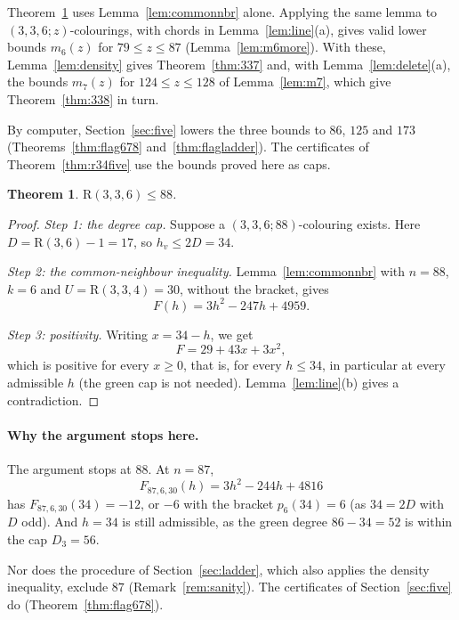 \documentclass[11pt]{article}
\theoremstyle{spacedplain}
\newtheorem{theorem}{Theorem}[section]
\theoremstyle{spaceddef}
\theoremstyle{spacedremark}
\newcommand{\R}{\mathrm{R}}
\begin{document}
Theorem~\ref{thm:336} uses Lemma~\ref{lem:commonnbr} alone.
Applying the same lemma to $(3,3,6;z)$-colourings, with chords in Lemma~\ref{lem:line}(a), gives valid lower bounds $m_6(z)$ for $79\le z\le 87$ (Lemma~\ref{lem:m6more}).
With these, Lemma~\ref{lem:density} gives Theorem~\ref{thm:337} and, with Lemma~\ref{lem:delete}(a), the bounds $m_7(z)$ for $124\le z\le 128$ of Lemma~\ref{lem:m7}, which give Theorem~\ref{thm:338} in turn.

By computer, Section~\ref{sec:five} lowers the three bounds to $86$, $125$ and $173$ (Theorems~\ref{thm:flag678} and~\ref{thm:flagladder}).
The certificates of Theorem~\ref{thm:r34five} use the bounds proved here as caps.

\begin{theorem}\label{thm:336}
$\R(3,3,6)\le 88$.
\end{theorem}

\begin{proof}
\emph{Step 1: the degree cap.}
Suppose a $(3,3,6;88)$-colouring exists.
Here $D=\R(3,6)-1=17$, so $h_v\le 2D=34$.

\emph{Step 2: the common-neighbour inequality.}
Lemma~\ref{lem:commonnbr} with $n=88$, $k=6$ and $U=\R(3,3,4)=30$, without the bracket, gives
\[
F(h)=3h^2-247h+4959.
\]

\emph{Step 3: positivity.}
Writing $x=34-h$, we get
\[
F=29+43x+3x^2,
\]
which is positive for every $x\ge 0$, that is, for every $h\le 34$, in particular at every admissible $h$ (the green cap is not needed).
Lemma~\ref{lem:line}(b) gives a contradiction.
\end{proof}

\paragraph{Why the argument stops here.}
The argument stops at $88$.
At $n=87$,
\[
F_{87,6,30}(h)=3h^2-244h+4816
\]
has $F_{87,6,30}(34)=-12$, or $-6$ with the bracket $p_6(34)=6$ (as $34=2D$ with $D$ odd).
And $h=34$ is still admissible, as the green degree $86-34=52$ is within the cap $D_3=56$.

Nor does the procedure of Section~\ref{sec:ladder}, which also applies the density inequality, exclude $87$ (Remark~\ref{rem:sanity}).
The certificates of Section~\ref{sec:five} do (Theorem~\ref{thm:flag678}).
\end{document}
